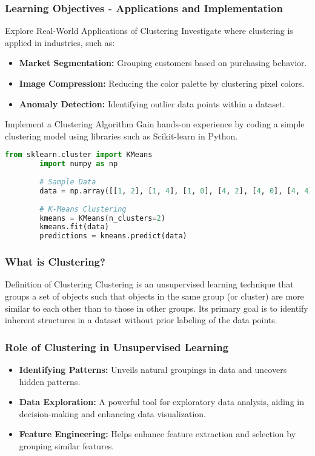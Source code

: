 \documentclass[aspectratio=169]{beamer}
\begin{document}
\begin{frame}[fragile]
    \frametitle{Learning Objectives - Applications and Implementation}
    \begin{block}{Explore Real-World Applications of Clustering}
        Investigate where clustering is applied in industries, such as:
        \begin{itemize}
            \item \textbf{Market Segmentation:} Grouping customers based on purchasing behavior.
            \item \textbf{Image Compression:} Reducing the color palette by clustering pixel colors.
            \item \textbf{Anomaly Detection:} Identifying outlier data points within a dataset.
        \end{itemize}
    \end{block}
    
    \begin{block}{Implement a Clustering Algorithm}
        Gain hands-on experience by coding a simple clustering model using libraries such as Scikit-learn in Python.
        
        \begin{lstlisting}[language=python]
        from sklearn.cluster import KMeans
        import numpy as np
        
        # Sample Data
        data = np.array([[1, 2], [1, 4], [1, 0], [4, 2], [4, 0], [4, 4]])
        
        # K-Means Clustering
        kmeans = KMeans(n_clusters=2)
        kmeans.fit(data)
        predictions = kmeans.predict(data)
        \end{lstlisting}
    \end{block}
\end{frame}

\begin{frame}[fragile]
    \frametitle{What is Clustering?}
    \begin{block}{Definition of Clustering}
        Clustering is an unsupervised learning technique that groups a set of objects such that 
        objects in the same group (or cluster) are more similar to each other than to those in other groups. 
        Its primary goal is to identify inherent structures in a dataset without prior labeling of the data points.
    \end{block}
\end{frame}

\begin{frame}[fragile]
    \frametitle{Role of Clustering in Unsupervised Learning}
    \begin{itemize}
        \item \textbf{Identifying Patterns:} Unveils natural groupings in data and uncovers hidden patterns.
        \item \textbf{Data Exploration:} A powerful tool for exploratory data analysis, aiding in decision-making and enhancing data visualization.
        \item \textbf{Feature Engineering:} Helps enhance feature extraction and selection by grouping similar features.
    \end{itemize}
\end{frame}
\end{document}
